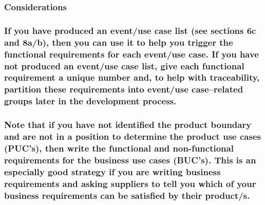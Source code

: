 \documentclass[
]{article}
\begin{document}
\hypertarget{considerations-17}{%
\subsubsection{Considerations}\label{considerations-17}}

\hypertarget{if-you-have-produced-an-eventuse-case-list-see-sections-6c-and-8ab-then-you-can-use-it-to-help-you-trigger-the-functional-requirements-for-each-eventuse-case.-if-you-have-not-produced-an-eventuse-case-list-give-each-functional-requirement-a-unique-number-and-to-help-with-traceability-partition-these-requirements-into-eventuse-caserelated-groups-later-in-the-development-process.}{%
\subsubsection{If you have produced an event/use case list (see sections
6c and 8a/b), then you can use it to help you trigger the functional
requirements for each event/use case. If you have not produced an
event/use case list, give each functional requirement a unique number
and, to help with traceability, partition these requirements into
event/use case--related groups later in the development
process.}\label{if-you-have-produced-an-eventuse-case-list-see-sections-6c-and-8ab-then-you-can-use-it-to-help-you-trigger-the-functional-requirements-for-each-eventuse-case.-if-you-have-not-produced-an-eventuse-case-list-give-each-functional-requirement-a-unique-number-and-to-help-with-traceability-partition-these-requirements-into-eventuse-caserelated-groups-later-in-the-development-process.}}

\hypertarget{note-that-if-you-have-not-identified-the-product-boundary-and-are-not-in-a-position-to-determine-the-product-use-cases-pucs-then-write-the-functional-and-non-functional-requirements-for-the-business-use-cases-bucs.-this-is-an-especially-good-strategy-if-you-are-writing-business-requirements-and-asking-suppliers-to-tell-you-which-of-your-business-requirements-can-be-satisfied-by-their-products.}{%
\subsubsection{Note that if you have not identified the product boundary
and are not in a position to determine the product use cases (PUC's),
then write the functional and non-functional requirements for the
business use cases (BUC's). This is an especially good strategy if you
are writing business requirements and asking suppliers to tell you which
of your business requirements can be satisfied by their
product/s.}\label{note-that-if-you-have-not-identified-the-product-boundary-and-are-not-in-a-position-to-determine-the-product-use-cases-pucs-then-write-the-functional-and-non-functional-requirements-for-the-business-use-cases-bucs.-this-is-an-especially-good-strategy-if-you-are-writing-business-requirements-and-asking-suppliers-to-tell-you-which-of-your-business-requirements-can-be-satisfied-by-their-products.}}
\end{document}
